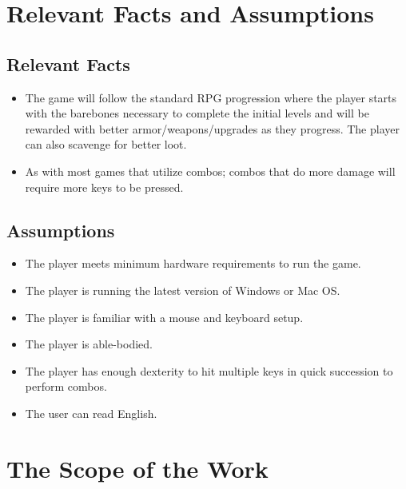\documentclass{article}
\begin{document}
	\section{Relevant Facts and Assumptions}
	\subsection{Relevant Facts}

	\begin{itemize}
	    \item The game will follow the standard RPG progression where the player starts with the barebones necessary to complete the initial levels and will be rewarded with better armor/weapons/upgrades as they progress. The player can also scavenge for better loot.
	    \item As with most games that utilize combos; combos that do more damage will require more keys to be pressed.
	\end{itemize}
	\subsection{Assumptions}
	\begin{itemize}
		\item The player meets minimum hardware requirements to run the game.
		\item The player is running the latest version of Windows or Mac OS.
		\item The player is familiar with a mouse and keyboard setup.
		\item The player is able-bodied.
		\item The player has enough dexterity to hit multiple keys in quick succession to perform combos.
		\item The user can read English.
	\end{itemize}

	\section{The Scope of the Work}
\end{document}
